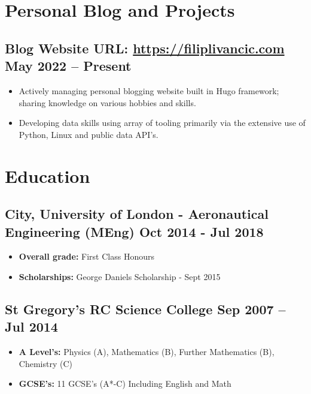 \documentclass[a4paper,9pt]{article}
\begin{document}
\section*{Personal Blog and Projects}

\subsection*{\textbf{Blog Website URL}: \url{https://filiplivancic.com} \hfill  May 2022 – Present}
\begin{itemize}[noitemsep]
	\item  Actively managing personal blogging website built in Hugo framework; sharing knowledge on various hobbies and skills.
    \item  Developing data skills using array of tooling primarily via the extensive use of Python, Linux and public data API's.
\end{itemize}

\section*{Education}
\subsection*{\textbf {City, University of London - Aeronautical Engineering (MEng)}  \hfill Oct 2014 - Jul 2018}\FloatBarrier
\begin{itemize}[noitemsep]
	\item \textbf{Overall grade:} First Class Honours %
    \item \textbf{Scholarships:} \hspace{0mm} George Daniels Scholarship - Sept 2015
\end{itemize}

\subsection*{\textbf{St Gregory’s RC Science College} \hfill  Sep 2007 – Jul 2014}
\begin{itemize}[noitemsep]
    \item \textbf{A Level's:} Physics (A), Mathematics (B), Further Mathematics (B), Chemistry (C)
    \item \textbf{GCSE’s:} \hspace{1.2mm} 11 GCSE’s (A*-C) Including English and Math
\end{itemize}

\date{}
\end{document}
